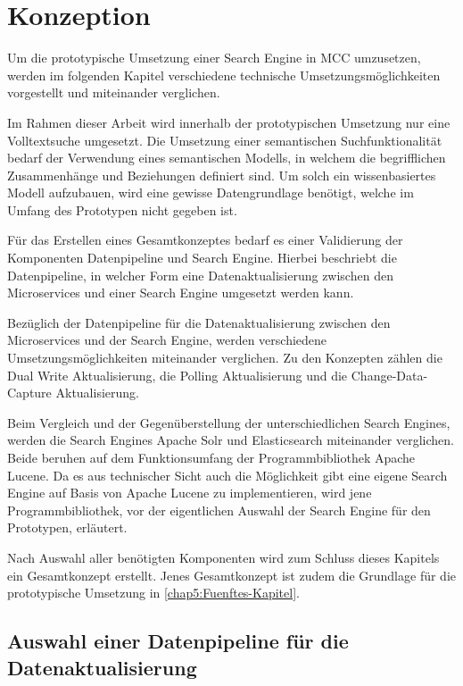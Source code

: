 \chapter{Konzeption\label{chap4:Viertes-Kapitel}}

Um die prototypische Umsetzung einer Search Engine in MCC umzusetzen, werden im folgenden Kapitel verschiedene technische Umsetzungsmöglichkeiten vorgestellt und miteinander verglichen.

Im Rahmen dieser Arbeit wird innerhalb der prototypischen Umsetzung nur eine Volltextsuche umgesetzt. Die Umsetzung einer semantischen Suchfunktionalität bedarf der Verwendung eines semantischen Modells, in welchem die begrifflichen Zusammenhänge und Beziehungen definiert sind. Um solch ein wissenbasiertes Modell aufzubauen, wird eine gewisse Datengrundlage benötigt, welche im Umfang des Prototypen nicht gegeben ist.

Für das Erstellen eines Gesamtkonzeptes bedarf es einer Validierung der Komponenten \glqq Datenpipeline\grqq{} und \glqq Search Engine\grqq{}. Hierbei beschriebt die Datenpipeline, in welcher Form eine Datenaktualisierung zwischen den Microservices und einer Search Engine umgesetzt werden kann.

Bezüglich der Datenpipeline für die Datenaktualisierung zwischen den Microservices und der Search Engine, werden verschiedene Umsetzungsmöglichkeiten miteinander verglichen. Zu den Konzepten zählen die \glqq Dual Write Aktualisierung\grqq{}, die \glqq Polling Aktualisierung\grqq{} und die \glqq Change-Data-Capture Aktualisierung\grqq{}.

Beim Vergleich und der Gegenüberstellung der unterschiedlichen Search Engines, werden die Search Engines \glqq Apache Solr\grqq{} und \glqq Elasticsearch\grqq{} miteinander verglichen. Beide beruhen auf dem Funktionsumfang der Programmbibliothek \glqq Apache Lucene\grqq{}. Da es aus technischer Sicht auch die Möglichkeit gibt eine eigene Search Engine auf Basis von \glqq Apache Lucene\grqq{} zu implementieren, wird jene Programmbibliothek, vor der eigentlichen Auswahl der Search Engine für den Prototypen, erläutert.

Nach Auswahl aller benötigten Komponenten wird zum Schluss dieses Kapitels ein Gesamtkonzept erstellt. Jenes Gesamtkonzept ist zudem die Grundlage für die prototypische Umsetzung in \autoref{chap5:Fuenftes-Kapitel}.

\section{Auswahl einer Datenpipeline für die Datenaktualisierung\label{sec4.1:Unterpunkt-1}}


